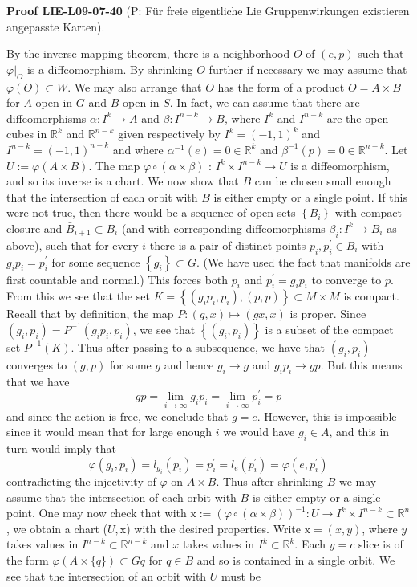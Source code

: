 \documentclass[10pt, letterpaper]{article}
\newcommand{\CustomHeading}[3]{%
  \par\medskip\noindent%
  \textbf{#1 #2} \textnormal{(#3)}.\enskip%
}
\newenvironment{PROOF}[2]{\CustomHeading{Proof}{#1}{#2}}{}
\begin{document}
\begin{PROOF}{LIE-L09-07-40}{P: Für freie eigentliche Lie Gruppenwirkungen existieren angepasste Karten}
By the inverse mapping theorem, there is a neighborhood $O$ of $(e, p)$ such that $\left.\varphi\right|_{O}$ is a diffeomorphism. By shrinking $O$ further if necessary we may assume that $\varphi(O) \subset W$. We may also arrange that $O$ has the form of a product $O=A \times B$ for $A$ open in $G$ and $B$ open in $S$. In fact, we can assume that there are diffeomorphisms $\alpha: I^{k} \rightarrow A$ and $\beta: I^{n-k} \rightarrow B$, where $I^{k}$ and $I^{n-k}$ are the open cubes in $\mathbb{R}^{k}$ and $\mathbb{R}^{n-k}$ given respectively by $I^{k}=(-1,1)^{k}$ and $I^{n-k}=(-1,1)^{n-k}$ and where $\alpha^{-1}(e)=0 \in \mathbb{R}^{k}$ and $\beta^{-1}(p)=0 \in \mathbb{R}^{n-k}$. Let $U:=\varphi(A \times B)$. The map $\varphi \circ(\alpha \times \beta)$ : $I^{k} \times I^{n-k} \rightarrow U$ is a diffeomorphism, and so its inverse is a chart. We now show that $B$ can be chosen small enough that the intersection of each orbit with $B$ is either empty or a single point. If this were not true, then there would be a sequence of open sets $\left\{B_{i}\right\}$ with compact closure and $\bar{B}_{i+1} \subset B_{i}$ (and with corresponding diffeomorphisms $\beta_{i}: I^{k} \rightarrow B_{i}$ as above), such that for every $i$ there is a pair of distinct points $p_{i}, p_{i}^{\prime} \in B_{i}$ with $g_{i} p_{i}=p_{i}^{\prime}$ for some sequence $\left\{g_{i}\right\} \subset G$. (We have used the fact that manifolds are first countable and normal.) This forces both $p_{i}$ and $p_{i}^{\prime}=g_{i} p_{i}$ to converge to $p$. From this we see that the set $K=\left\{\left(g_{i} p_{i}, p_{i}\right),(p, p)\right\} \subset M \times M$ is compact. Recall that by definition, the map $P:(g, x) \mapsto(g x, x)$ is proper. Since $\left(g_{i}, p_{i}\right)=P^{-1}\left(g_{i} p_{i}, p_{i}\right)$, we see that $\left\{\left(g_{i}, p_{i}\right)\right\}$ is a subset of the compact set $P^{-1}(K)$. Thus after passing to a subsequence, we have that $\left(g_{i}, p_{i}\right)$ converges to $(g, p)$ for some $g$ and hence $g_{i} \rightarrow g$ and $g_{i} p_{i} \rightarrow g p$. But this means that we have
$$
g p=\lim _{i \rightarrow \infty} g_{i} p_{i}=\lim _{i \rightarrow \infty} p_{i}^{\prime}=p
$$
and since the action is free, we conclude that $g=e$. However, this is impossible since it would mean that for large enough $i$ we would have $g_{i} \in A$, and this in turn would imply that
$$
\varphi\left(g_{i}, p_{i}\right)=l_{g_{i}}\left(p_{i}\right)=p_{i}^{\prime}=l_{e}\left(p_{i}^{\prime}\right)=\varphi\left(e, p_{i}^{\prime}\right)
$$
contradicting the injectivity of $\varphi$ on $A \times B$. Thus after shrinking $B$ we may assume that the intersection of each orbit with $B$ is either empty or a single point. One may now check that with $\mathrm{x}:=(\varphi \circ(\alpha \times \beta))^{-1}: U \rightarrow I^{k} \times I^{n-k} \subset \mathbb{R}^{n}$, we obtain a chart ($U,\mathrm{x}$) with the desired properties. Write $\mathrm{x}=(x, y)$, where $y$ takes values in $I^{n-k} \subset \mathbb{R}^{n-k}$ and $x$ takes values in $I^{k} \subset \mathbb{R}^{k}$. Each $y=c$ slice is of the form $\varphi(A \times\{q\}) \subset G q$ for $q \in B$ and so is contained in a single orbit. We see that the intersection of an orbit with $U$ must be

\end{PROOF}
\end{document}
